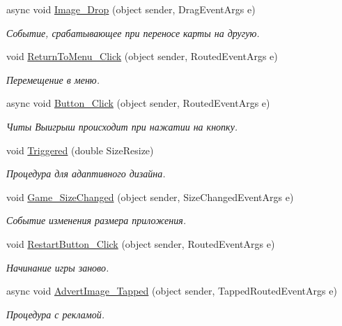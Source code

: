 \begin{DoxyCompactItemize}
async void \hyperlink{class_pasyans_cover_u_w_p_1_1_game_page_aa682318ae23a5287134042c6fee5bd21}{Image\+\_\+\+Drop} (object sender, Drag\+Event\+Args e)
\begin{DoxyCompactList}\small\item\em Событие, срабатывающее при переносе карты на другую. \end{DoxyCompactList}\item 
void \hyperlink{class_pasyans_cover_u_w_p_1_1_game_page_a90a511fcd533f56ae276b2eab9751e20}{Return\+To\+Menu\+\_\+\+Click} (object sender, Routed\+Event\+Args e)
\begin{DoxyCompactList}\small\item\em Перемещение в меню. \end{DoxyCompactList}\item 
async void \hyperlink{class_pasyans_cover_u_w_p_1_1_game_page_af17d3b02f3db6ba2e95e1d735abfdece}{Button\+\_\+\+Click} (object sender, Routed\+Event\+Args e)
\begin{DoxyCompactList}\small\item\em {\itshape Читы} Выигрыш происходит при нажатии на кнопку. \end{DoxyCompactList}\item 
void \hyperlink{class_pasyans_cover_u_w_p_1_1_game_page_ab96dd33188b7ebb2a6f40110fe2d4cb5}{Triggered} (double Size\+Resize)
\begin{DoxyCompactList}\small\item\em Процедура для адаптивного дизайна. \end{DoxyCompactList}\item 
void \hyperlink{class_pasyans_cover_u_w_p_1_1_game_page_a062bef918b47d0786b00d1f1738fdfa8}{Game\+\_\+\+Size\+Changed} (object sender, Size\+Changed\+Event\+Args e)
\begin{DoxyCompactList}\small\item\em Событие изменения размера приложения. \end{DoxyCompactList}\item 
void \hyperlink{class_pasyans_cover_u_w_p_1_1_game_page_a204ffa1fc3084fe28bef4826572bbc22}{Restart\+Button\+\_\+\+Click} (object sender, Routed\+Event\+Args e)
\begin{DoxyCompactList}\small\item\em Начинание игры заново. \end{DoxyCompactList}\item 
async void \hyperlink{class_pasyans_cover_u_w_p_1_1_game_page_a31a97c290129f77a91f790207391350c}{Advert\+Image\+\_\+\+Tapped} (object sender, Tapped\+Routed\+Event\+Args e)
\begin{DoxyCompactList}\small\item\em Процедура с рекламой. \end{DoxyCompactList}\end{DoxyCompactItemize}
